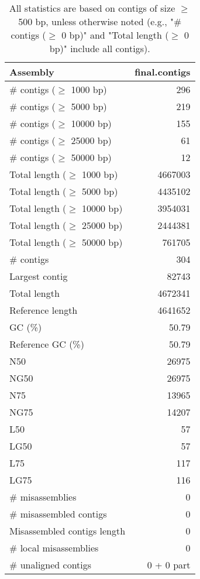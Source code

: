 \documentclass[12pt,a4paper]{article}
\begin{document}
\begin{table}[ht]
\begin{center}
\caption{All statistics are based on contigs of size $\geq$ 500 bp, unless otherwise noted (e.g., "\# contigs ($\geq$ 0 bp)" and "Total length ($\geq$ 0 bp)" include all contigs).}
\begin{tabular}{|l*{1}{|r}|}
\hline
Assembly & final.contigs \\ \hline
\# contigs ($\geq$ 1000 bp) & 296 \\ \hline
\# contigs ($\geq$ 5000 bp) & 219 \\ \hline
\# contigs ($\geq$ 10000 bp) & 155 \\ \hline
\# contigs ($\geq$ 25000 bp) & 61 \\ \hline
\# contigs ($\geq$ 50000 bp) & 12 \\ \hline
Total length ($\geq$ 1000 bp) & 4667003 \\ \hline
Total length ($\geq$ 5000 bp) & 4435102 \\ \hline
Total length ($\geq$ 10000 bp) & 3954031 \\ \hline
Total length ($\geq$ 25000 bp) & 2444381 \\ \hline
Total length ($\geq$ 50000 bp) & 761705 \\ \hline
\# contigs & 304 \\ \hline
Largest contig & 82743 \\ \hline
Total length & 4672341 \\ \hline
Reference length & 4641652 \\ \hline
GC (\%) & 50.79 \\ \hline
Reference GC (\%) & 50.79 \\ \hline
N50 & 26975 \\ \hline
NG50 & 26975 \\ \hline
N75 & 13965 \\ \hline
NG75 & 14207 \\ \hline
L50 & 57 \\ \hline
LG50 & 57 \\ \hline
L75 & 117 \\ \hline
LG75 & 116 \\ \hline
\# misassemblies & 0 \\ \hline
\# misassembled contigs & 0 \\ \hline
Misassembled contigs length & 0 \\ \hline
\# local misassemblies & 0 \\ \hline
\# unaligned contigs & 0 + 0 part \\ \hline

\end{tabular}
\end{center}
\end{table}
\end{document}
